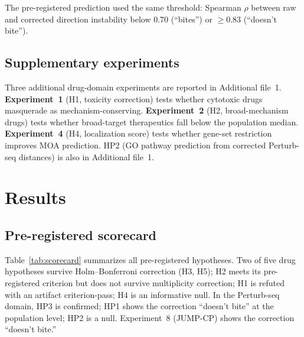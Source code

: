 \documentclass[11pt]{article}
\begin{document}
The pre-registered prediction used the same threshold: Spearman $\rho$
between raw and corrected direction instability below 0.70 (``bites'')
or $\geq 0.83$ (``doesn't bite'').

\subsection{Supplementary experiments}

Three additional drug-domain experiments are reported in Additional
file~1. \textbf{Experiment~1}
(H1, toxicity correction) tests whether cytotoxic drugs masquerade as
mechanism-conserving. \textbf{Experiment~2} (H2, broad-mechanism drugs)
tests whether broad-target therapeutics fall below the population median.
\textbf{Experiment~4} (H4, localization score) tests whether gene-set
restriction improves MOA prediction. HP2 (GO pathway prediction from
corrected Perturb-seq distances) is also in Additional file~1.

\section{Results}

\subsection{Pre-registered scorecard}

Table~\ref{tab:scorecard} summarizes all pre-registered hypotheses.
Two of five drug hypotheses survive Holm--Bonferroni correction (H3, H5);
H2 meets its pre-registered criterion but does not survive multiplicity
correction; H1 is refuted with an artifact criterion-pass; H4 is an
informative null.
In the Perturb-seq domain, HP3 is confirmed; HP1 shows the correction
``doesn't bite'' at the population level; HP2 is a null. Experiment~8
(JUMP-CP) shows the correction ``doesn't bite.''
\end{document}
